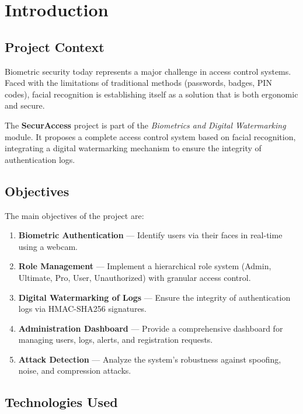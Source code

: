 \chapter{Introduction}

\section{Project Context}

Biometric security today represents a major challenge in access control systems. Faced with the limitations of traditional methods (passwords, badges, PIN codes), facial recognition is establishing itself as a solution that is both ergonomic and secure.

The \textbf{SecurAccess} project is part of the \textit{Biometrics and Digital Watermarking} module. It proposes a complete access control system based on facial recognition, integrating a digital watermarking mechanism to ensure the integrity of authentication logs.

\section{Objectives}

The main objectives of the project are:

\begin{enumerate}[label=\arabic*.]
    \item \textbf{Biometric Authentication} — Identify users via their faces in real-time using a webcam.
    \item \textbf{Role Management} — Implement a hierarchical role system (Admin, Ultimate, Pro, User, Unauthorized) with granular access control.
    \item \textbf{Digital Watermarking of Logs} — Ensure the integrity of authentication logs via HMAC-SHA256 signatures.
    \item \textbf{Administration Dashboard} — Provide a comprehensive dashboard for managing users, logs, alerts, and registration requests.
    \item \textbf{Attack Detection} — Analyze the system's robustness against spoofing, noise, and compression attacks.
\end{enumerate}

\section{Technologies Used}

